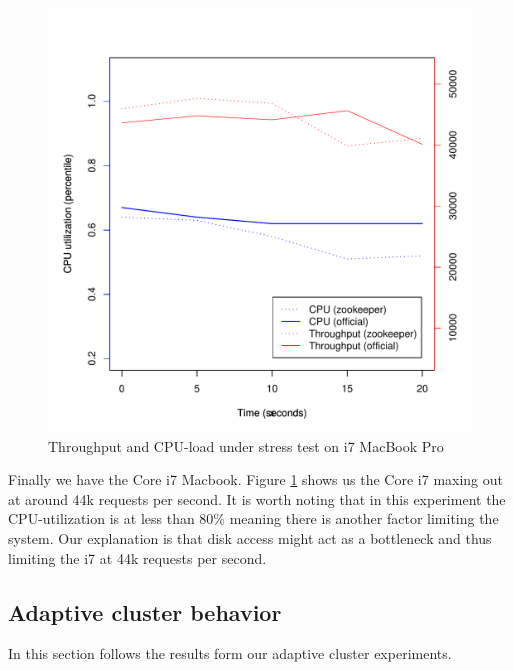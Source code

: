 \begin{figure}[h]
    \centering
    \includegraphics[width=1.0\textwidth]{results/throughput/singlenode/throughput_eivind}
    \caption{Throughput and CPU-load under stress test on i7 MacBook Pro}
    \label{fig:thug_eivind}
\end{figure}

Finally we have the Core i7 Macbook. Figure \ref{fig:thug_eivind} shows us the Core i7 maxing out at around 44k requests per second. It is worth noting that in this experiment the CPU-utilization is at less than 80\% meaning there is another factor limiting the system. Our explanation is that disk access might act as a bottleneck and thus limiting the i7 at 44k requests per second.


\clearpage
\subsection{Adaptive cluster behavior}
In this section follows the results form our adaptive cluster experiments.

